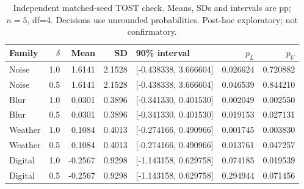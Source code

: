 \begin{table}[!htbp]
\centering\small
\setlength{\tabcolsep}{4pt}
\caption{Independent matched-seed TOST check. Means, SDs and intervals are pp; $n=5$, df=4. Decisions use unrounded probabilities. Post-hoc exploratory; not confirmatory.}\label{tab:tostverify}
\begin{tabular}{lrrrlrr}\toprule
Family & $\delta$ & Mean & SD & 90\% interval & $p_L$ & $p_U$\\\midrule
Noise & 1.0 & 1.6141 & 2.1528 & [-0.438338, 3.666604] & 0.026624 & 0.720882\\
Noise & 0.5 & 1.6141 & 2.1528 & [-0.438338, 3.666604] & 0.046539 & 0.844210\\
Blur & 1.0 & 0.0301 & 0.3896 & [-0.341330, 0.401530] & 0.002049 & 0.002550\\
Blur & 0.5 & 0.0301 & 0.3896 & [-0.341330, 0.401530] & 0.019153 & 0.027131\\
Weather & 1.0 & 0.1084 & 0.4013 & [-0.274166, 0.490966] & 0.001745 & 0.003830\\
Weather & 0.5 & 0.1084 & 0.4013 & [-0.274166, 0.490966] & 0.013761 & 0.047257\\
Digital & 1.0 & -0.2567 & 0.9298 & [-1.143158, 0.629758] & 0.074185 & 0.019539\\
Digital & 0.5 & -0.2567 & 0.9298 & [-1.143158, 0.629758] & 0.294944 & 0.071456\\
\bottomrule\end{tabular}
\end{table}
